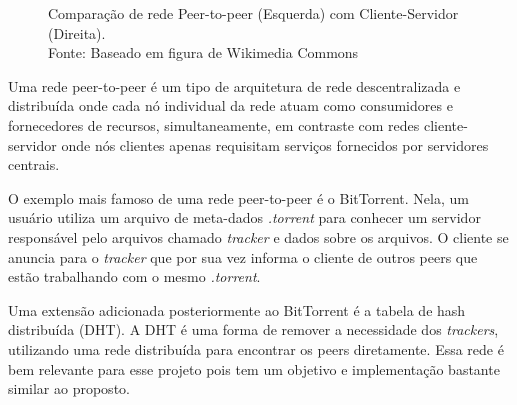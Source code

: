   \begin{figure}[h]
    \begin{centering}
    \caption{Comparação de rede Peer-to-peer (Esquerda) com Cliente-Servidor (Direita). \\
      Fonte: Baseado em figura de Wikimedia Commons}
    \end{centering}
  \end{figure}

  Uma rede peer-to-peer é um tipo de arquitetura de rede descentralizada e distribuída
  onde cada nó individual da rede atuam como consumidores e fornecedores de recursos,
  simultaneamente, em contraste com redes cliente-servidor onde nós clientes apenas
  requisitam serviços fornecidos por servidores centrais. \cite{peertopeer:definition}
  
  O exemplo mais famoso de uma rede peer-to-peer é o BitTorrent. Nela, um usuário utiliza um
  arquivo de meta-dados \textit{.torrent} para conhecer um servidor responsável pelo arquivos
  chamado \textit{tracker} e dados sobre os arquivos. O cliente se anuncia para o \textit{tracker} que
  por sua vez informa o cliente de outros peers que estão trabalhando com o mesmo \textit{.torrent}.
  
  Uma extensão adicionada posteriormente ao BitTorrent é a tabela de hash distribuída (DHT).
  A DHT é uma forma de remover a necessidade dos \textit{trackers}, utilizando uma rede distribuída
  para encontrar os peers diretamente. Essa rede é bem relevante para esse projeto pois tem um
  objetivo e implementação bastante similar ao proposto.

